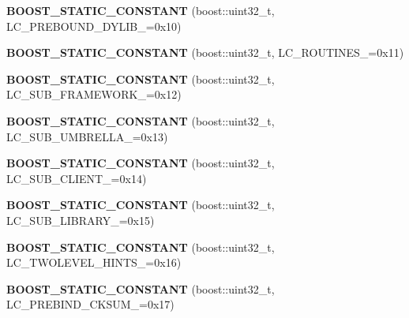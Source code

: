\begin{DoxyCompactItemize}
\item 
\mbox{\label{a01552_a1b6f018aec128a2631bf6967aea98ed2}} 
{\bfseries B\+O\+O\+S\+T\+\_\+\+S\+T\+A\+T\+I\+C\+\_\+\+C\+O\+N\+S\+T\+A\+NT} (boost\+::uint32\+\_\+t, L\+C\+\_\+\+P\+R\+E\+B\+O\+U\+N\+D\+\_\+\+D\+Y\+L\+I\+B\+\_\+=0x10)
\item 
\mbox{\label{a01552_ad1131bfba2fa6f9dd5f0ea8920a381c2}} 
{\bfseries B\+O\+O\+S\+T\+\_\+\+S\+T\+A\+T\+I\+C\+\_\+\+C\+O\+N\+S\+T\+A\+NT} (boost\+::uint32\+\_\+t, L\+C\+\_\+\+R\+O\+U\+T\+I\+N\+E\+S\+\_\+=0x11)
\item 
\mbox{\label{a01552_a9c41f0e7dc278391f579f77e91a07386}} 
{\bfseries B\+O\+O\+S\+T\+\_\+\+S\+T\+A\+T\+I\+C\+\_\+\+C\+O\+N\+S\+T\+A\+NT} (boost\+::uint32\+\_\+t, L\+C\+\_\+\+S\+U\+B\+\_\+\+F\+R\+A\+M\+E\+W\+O\+R\+K\+\_\+=0x12)
\item 
\mbox{\label{a01552_a1df09850516fe437ff713cb79cc9aa75}} 
{\bfseries B\+O\+O\+S\+T\+\_\+\+S\+T\+A\+T\+I\+C\+\_\+\+C\+O\+N\+S\+T\+A\+NT} (boost\+::uint32\+\_\+t, L\+C\+\_\+\+S\+U\+B\+\_\+\+U\+M\+B\+R\+E\+L\+L\+A\+\_\+=0x13)
\item 
\mbox{\label{a01552_acb528f4af43aa526018d244e8d9f629b}} 
{\bfseries B\+O\+O\+S\+T\+\_\+\+S\+T\+A\+T\+I\+C\+\_\+\+C\+O\+N\+S\+T\+A\+NT} (boost\+::uint32\+\_\+t, L\+C\+\_\+\+S\+U\+B\+\_\+\+C\+L\+I\+E\+N\+T\+\_\+=0x14)
\item 
\mbox{\label{a01552_a870c906c9b1cde926a0cef6062da656c}} 
{\bfseries B\+O\+O\+S\+T\+\_\+\+S\+T\+A\+T\+I\+C\+\_\+\+C\+O\+N\+S\+T\+A\+NT} (boost\+::uint32\+\_\+t, L\+C\+\_\+\+S\+U\+B\+\_\+\+L\+I\+B\+R\+A\+R\+Y\+\_\+=0x15)
\item 
\mbox{\label{a01552_a7440e6fdac527eb9187d0c9dd9b6329d}} 
{\bfseries B\+O\+O\+S\+T\+\_\+\+S\+T\+A\+T\+I\+C\+\_\+\+C\+O\+N\+S\+T\+A\+NT} (boost\+::uint32\+\_\+t, L\+C\+\_\+\+T\+W\+O\+L\+E\+V\+E\+L\+\_\+\+H\+I\+N\+T\+S\+\_\+=0x16)
\item 
\mbox{\label{a01552_a0f968b033a624306ac18c80019f4c9bb}} 
{\bfseries B\+O\+O\+S\+T\+\_\+\+S\+T\+A\+T\+I\+C\+\_\+\+C\+O\+N\+S\+T\+A\+NT} (boost\+::uint32\+\_\+t, L\+C\+\_\+\+P\+R\+E\+B\+I\+N\+D\+\_\+\+C\+K\+S\+U\+M\+\_\+=0x17)
\item 

\end{DoxyCompactItemize}

